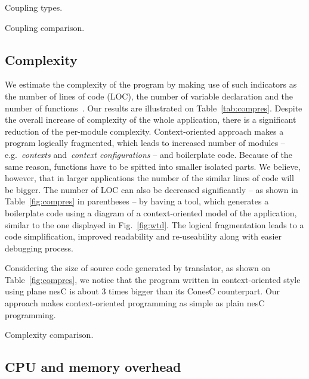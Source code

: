 \begin{table}[!h]
\renewcommand{\arraystretch}{1.3}
\caption{Coupling types.}
\label{tab:couptypes}

\end{table}

\begin{table}[!h]
\renewcommand{\arraystretch}{1.3}
\caption{Coupling comparison.}
\label{tab:coupres}

\end{table}

\subsection{Complexity} 

We estimate the complexity of the program by making use of such indicators as the number of
lines of code (LOC), the number of variable declaration and the number of
functions~\cite{pressman01}. Our results are illustrated on
Table~\ref{tab:compres}. Despite the overall increase of complexity of the whole
application, there is a significant reduction of the per-module complexity.
Context-oriented approach makes a program logically
fragmented, which leads to increased number of modules -- e.g.~\emph{contexts}
and~\emph{context configurations} -- and boilerplate code. Because of the same
reason, functions have to be spitted into smaller isolated parts. We believe, however,
that in larger applications the number of the similar lines of code will be bigger.
The number of LOC can also be decreased significantly -- as shown in Table~\ref{fig:compres} in
parentheses -- by having a tool, which generates a boilerplate code using a diagram of a
context-oriented model of the application, similar to the one displayed in
Fig.~\ref{fig:wtd}. The logical fragmentation leads to a code simplification,
improved readability and re-useability along with easier debugging process.

Considering the size of source code generated by translator, as shown on
Table~\ref{fig:compres}, we notice that the program written in context-oriented
style using plane nesC  is about 3 times bigger than its ConesC counterpart. Our
approach makes context-oriented programming as simple as plain nesC programming.

\begin{table}[!h]
\renewcommand{\arraystretch}{1.3}
\caption{Complexity comparison.}
\label{tab:compres}

\end{table}

\subsection{CPU and memory overhead}

